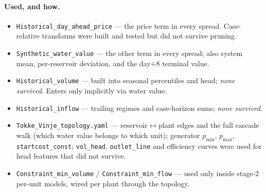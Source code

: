 \paragraph{Used, and how.}
\begin{itemize}\itemsep1pt
  \item \texttt{Historical\_day\_ahead\_price} --- the price term in every spread. Case-relative
        transforms were built and tested but did not survive pruning.
  \item \texttt{Synthetic\_water\_value} --- the other term in every spread; also system mean,
        per-reservoir deviation, and the day$+$8 terminal value.
  \item \texttt{Historical\_volume} --- built into seasonal percentiles and head; \emph{none
        survived}. Enters only implicitly via water value.
  \item \texttt{Historical\_inflow} --- trailing regimes and case-horizon sums; \emph{none
        survived}.
  \item \texttt{Tokke\_Vinje\_topology.yaml} --- reservoir$\leftrightarrow$plant edges and the full
        cascade walk (which water value belongs to which unit); generator $p_{\min}$, $p_{\max}$,
        \texttt{startcost\_const}; \texttt{vol\_head}, \texttt{outlet\_line} and efficiency curves
        were used for head features that did not survive.
  \item \texttt{Constraint\_min\_volume} / \texttt{Constraint\_min\_flow} --- used only inside
        stage-2 per-unit models, wired per plant through the topology.
\end{itemize}


